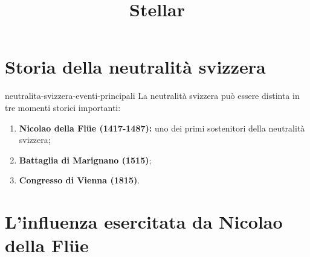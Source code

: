 \documentclass[preview]{standalone}
\begin{document}
\title{Stellar}
\genpage

\section{Storia della neutralità svizzera}

\begin{snippet}{neutralita-svizzera-eventi-principali}
    La neutralità svizzera può essere distinta in tre momenti storici importanti:
    \begin{enumerate}
        \item \textbf{Nicolao della Flüe (1417-1487):} uno dei primi sostenitori della neutralità svizzera;
        \item \textbf{Battaglia di Marignano (1515)};
        \item \textbf{Congresso di Vienna (1815)}.
    \end{enumerate}
\end{snippet}

\section{L'influenza esercitata da Nicolao della Flüe}

\end{document}
